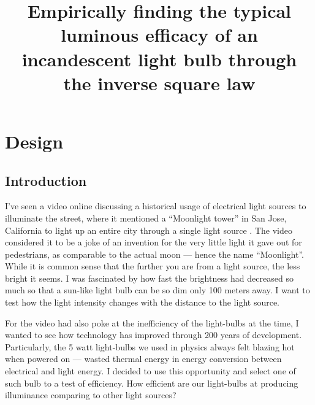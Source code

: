 \documentclass[a4paper,12pt]{article}
\title{Empirically finding the typical luminous efficacy of an incandescent light bulb through the inverse square law}
\author{}
\date{\vspace{-8ex}}
\begin{document}
\maketitle

\section{Design}

\subsection{Introduction}
I've seen a video online discussing a historical usage of electrical light sources to illuminate the street, where it mentioned a ``Moonlight tower'' in San Jose, California to light up an entire city through a single light source \parencite{tower}. The video considered it to be a joke of an invention for the very little light it gave out for pedestrians, as comparable to the actual moon --- hence the name ``Moonlight''. While it is common sense that the further you are from a light source, the less bright it seems. I was fascinated by how fast the brightness had decreased so much so that a sun-like light bulb can be so dim only 100 meters away. I want to test how the light intensity changes with the distance to the light source.

For the video had also poke at the inefficiency of the light-bulbs at the time, I wanted to see how technology has improved through 200 years of development. Particularly, the 5 watt light-bulbs we used in physics always felt blazing hot when powered on --- wasted thermal energy in energy conversion between electrical and light energy. I decided to use this opportunity and select one of such bulb to a test of efficiency. How efficient are our light-bulbs at producing illuminance comparing to other light sources?

\end{document}
